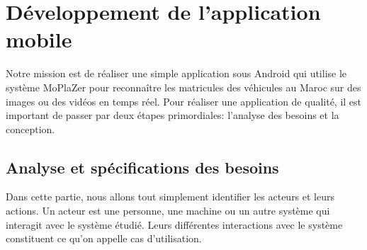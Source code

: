 \section{Développement de l'application mobile}
Notre mission est de réaliser une simple application sous Android qui utilise le système MoPlaZer pour reconnaître les matricules des véhicules au Maroc sur des images ou des vidéos en temps réel. Pour réaliser une application de qualité, il est important de passer par deux étapes primordiales: l'analyse des besoins et la conception.  
    \subsection{Analyse et spécifications des besoins}
    Dans cette partie, nous allons tout simplement identifier les acteurs et leurs actions. Un acteur est une personne, une machine ou un autre système qui interagit avec le système étudié. Leurs différentes interactions avec le système constituent ce qu'on appelle cas d'utilisation.

